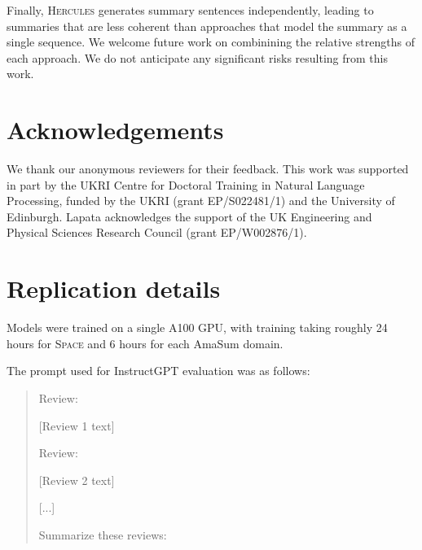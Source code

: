 \documentclass[11pt]{article}
\begin{document}
Finally, \textsc{Hercules} generates summary sentences independently, leading to summaries that are less coherent than approaches that model the summary as a single sequence. We welcome future work on combinining the relative strengths of each approach. We do not anticipate any significant risks resulting from this work.

\section*{Acknowledgements}
We thank our anonymous reviewers for their feedback. This work was supported in part by the UKRI Centre for Doctoral Training in Natural Language Processing, funded by the UKRI (grant EP/S022481/1) and the University of Edinburgh. Lapata acknowledges the
support of the UK Engineering and Physical Sciences Research Council (grant EP/W002876/1).





\appendix

\section{Replication details}
\label{app:replication}

Models were trained on a single A100 GPU, with training taking roughly 24 hours for \textsc{Space} and 6 hours for each AmaSum domain.



The prompt used for InstructGPT evaluation was as follows:

\begin{quote}
    Review:
    
    [Review 1 text]
    
    Review:
    
    [Review 2 text]
    
    [...]
    
    Summarize these reviews:
\end{quote}
\end{document}
